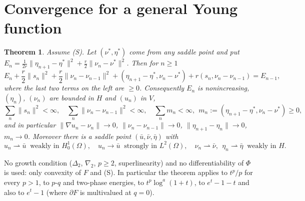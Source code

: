 \documentclass[11pt]{amsart}
\newtheorem{teo}{Theorem}
\theoremstyle{remark}
\theoremstyle{definition}
\begin{document}
\section{Convergence for a general Young function}
\begin{teo}\label{thm.A}
Assume (S). Let $(\nu^*,\eta^*)$ come from any saddle point and put $E_n=\frac1{2r}\|\eta_{n+1}-\eta^*\|^2+\frac r2\|\nu_n-\nu^*\|^2$. Then for $n\ge1$
\begin{equation}\label{lyap}
E_n+\frac r2\|s_n\|^2+\frac r2\|\nu_n-\nu_{n-1}\|^2+(\eta_{n+1}-\eta^*,\nu_n-\nu^*)+r(s_n,\nu_n-\nu_{n-1})=E_{n-1},
\end{equation}
where the last two terms on the left are $\ge0$. Consequently $E_n$ is nonincreasing, $(\eta_n)$, $(\nu_n)$ are bounded in $H$ and $(u_n)$ in $V$,
\[
\sum_n\|s_n\|^2<\infty,\quad \sum_n\|\nu_n-\nu_{n-1}\|^2<\infty,\quad \sum_n m_n<\infty,\ \ m_n:=(\eta_{n+1}-\eta^*,\nu_n-\nu^*)\ge0,
\]
and in particular $\|\nabla u_n-\nu_n\|\to0$, $\|\nu_n-\nu_{n-1}\|\to0$, $\|\eta_{n+1}-\eta_n\|\to0$, $m_n\to0$. Moreover there is a saddle point $(\bar u,\bar\nu,\bar\eta)$ with
\[
u_n\rightharpoonup\bar u\ \text{ weakly in }H^1_0(\Omega),\quad u_n\to\bar u\ \text{ strongly in }L^2(\Omega),\quad \nu_n\rightharpoonup\bar\nu,\ \ \eta_n\rightharpoonup\bar\eta\ \text{ weakly in }H.
\]
\end{teo}
No growth condition ($\Delta_2$, $\nabla_2$, $p\ge2$, superlinearity) and no differentiability of $\Phi$ is used: only convexity of $F$ and (S). In particular the theorem applies to $t^p/p$ for every $p>1$, to $p$-$q$ and two-phase energies, to $t^p\log^a(1+t)$, to $e^t-1-t$ and also to $e^t-1$ (where $\partial F$ is multivalued at $q=0$).
\end{document}
